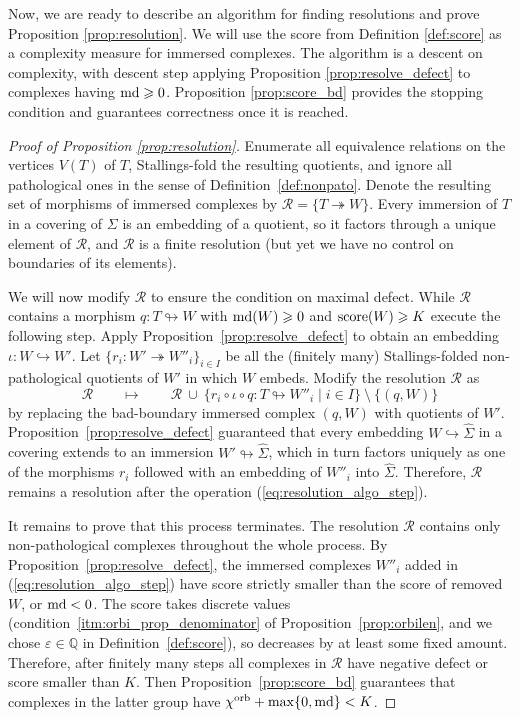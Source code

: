 \documentclass{amsart}
\newcommand{\cho}{\chi^{\textnormal{orb}}}
\newcommand{\md}{\textnormal{md}}
\newcommand{\tn}{\textnormal}
\newcommand{\whS}{{\widehat{\Sigma}}}
\begin{document}
Now, we are ready to describe an algorithm for finding resolutions and prove Proposition \ref{prop:resolution}. We will use the score from Definition \ref{def:score} as a complexity measure for immersed complexes. The algorithm is a descent on complexity, with descent step applying Proposition \ref{prop:resolve_defect} to complexes having $\md\geqslant0$. Proposition \ref{prop:score_bd} provides the stopping condition and guarantees correctness once it is reached.
\begin{proof}[Proof of Proposition \ref{prop:resolution}]
Enumerate all equivalence relations on the vertices $V(T)$ of $T$, Stallings-fold the resulting quotients, and ignore all pathological ones in the sense of Definition~\ref{def:nonpato}. Denote the resulting set of morphisms of immersed complexes by $\mathcal{R}=\{T\twoheadrightarrow W\}$. Every immersion of $T$ in a covering of $\Sigma$ is an embedding of a quotient, so it factors through a unique element of $\mathcal{R}$, and $\mathcal{R}$ is a finite resolution (but yet we have no control on boundaries of its elements).

We will now modify $\mathcal{R}$ to ensure the condition on maximal defect. While $\mathcal{R}$ contains a morphism $q\colon T\looparrowright W$ with $\md(W)\geqslant0$ and $\tn{score}(W)\geqslant K$ execute the following step. Apply Proposition~\ref{prop:resolve_defect} to obtain an embedding $\iota\colon W\hookrightarrow W'$. Let $\{r_i\colon W'\twoheadrightarrow W''_i\}_{i\in I}$ be all the (finitely many) Stallings-folded non-pathological quotients of $W'$ in which $W$ embeds. Modify the resolution $\mathcal{R}$ as
\begin{equation}\label{eq:resolution_algo_step}
\mathcal{R}\qquad\longmapsto\qquad\mathcal{R}\ \cup\ \{r_i\circ\iota\circ q\colon T\looparrowright W''_i\mid i\in I\}\ \setminus\ \{(q,W)\}
\end{equation}
by replacing the bad-boundary immersed complex $(q,W)$ with quotients of $W'$. Proposition~\ref{prop:resolve_defect} guaranteed that every embedding $W\hookrightarrow\whS$ in a covering extends to an immersion $W'\looparrowright\whS$, which in turn factors uniquely as one of the morphisms $r_i$ followed with an embedding of $W''_i$ into $\whS$. Therefore, $\mathcal{R}$ remains a resolution after the operation (\ref{eq:resolution_algo_step}).

It remains to prove that this process terminates. The resolution $\mathcal{R}$ contains only non-pathological complexes throughout the whole process. By Proposition~\ref{prop:resolve_defect}, the immersed complexes $W''_i$ added in (\ref{eq:resolution_algo_step}) have score strictly smaller than the score of removed $W$, or $\md<0$. The score takes discrete values (condition~\ref*{itm:orbi_prop_denominator} of Proposition~\ref{prop:orbilen}, and we chose $\varepsilon\in\mathbb{Q}$ in Definition~\ref{def:score}), so decreases by at least some fixed amount. Therefore, after finitely many steps all complexes in $\mathcal{R}$ have negative defect or score smaller than $K$. Then Proposition~\ref{prop:score_bd} guarantees that complexes in the latter group have $\cho+\max\{0,\md\}<K$.
\end{proof}
\end{document}
